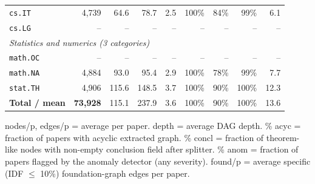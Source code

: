 \begin{table}[h]
\begin{tabular}{@{}lrrrrrrrr@{}}
\texttt{cs.IT} & 4{,}739 & 64.6 & 78.7 & 2.5 & 100\% & 84\% & 99\% & 6.1 \\
\texttt{cs.LG} & -- & -- & -- & -- & -- & -- & -- & -- \\
\midrule
\multicolumn{9}{l}{\textit{Statistics and numerics (3 categories)}} \\
\texttt{math.OC} & -- & -- & -- & -- & -- & -- & -- & -- \\
\texttt{math.NA} & 4{,}884 & 93.0 & 95.4 & 2.9 & 100\% & 78\% & 99\% & 7.7 \\
\texttt{stat.TH} & 4{,}906 & 115.6 & 148.5 & 3.7 & 100\% & 90\% & 100\% & 12.3 \\
\midrule
\textbf{Total / mean} & \textbf{73{,}928} & 115.1 & 237.9 & 3.6 & 100\% & 90\% & 100\% & 13.6 \\
\bottomrule
\end{tabular}

\vspace{0.4em}
\footnotesize
nodes/p, edges/p = average per paper. depth = average DAG depth. \% acyc = fraction of papers with acyclic extracted graph. \% concl = fraction of theorem-like nodes with non-empty conclusion field after splitter. \% anom = fraction of papers flagged by the anomaly detector (any severity). found/p = average specific (IDF $\leq$ 10\%) foundation-graph edges per paper.
\end{table}
